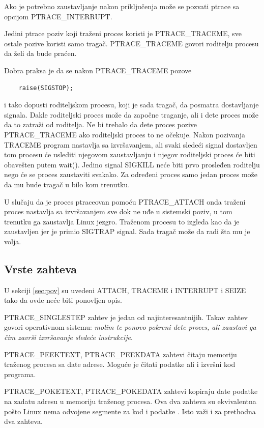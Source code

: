 \documentclass[a4paper]{article}
\begin{document}
Ako je potrebno zaustavljanje nakon priključenja može se pozvati ptrace sa opcijom PTRACE\_INTERRUPT.

Jedini ptrace poziv koji traženi proces koristi je PTRACE\_TRACEME, sve ostale pozive koristi samo tragač.
PTRACE\_TRACEME govori roditelju procesu da želi da bude praćen.

Dobra praksa je da se nakon PTRACE\_TRACEME pozove 
\begin{verbatim}
    raise(SIGSTOP);
\end{verbatim}
i tako dopusti roditeljskom procesu, koji je sada tragač, da posmatra dostavljanje signala.
Dakle roditeljski proces može da započne traganje, ali i dete proces može da to zatraži od roditelja.
Ne bi trebalo da dete proces pozive PTRACE\_TRACEME ako roditeljski proces to ne očekuje. 
Nakon pozivanja TRACEME program nastavlja sa izvršavanjem, ali svaki sledeći signal dostavljen tom procesu
će uslediti njegovom zaustavljanju i njegov roditeljski proces će biti obavešten putem wait(). 
Jedino signal SIGKILL neće biti prvo prosleđen roditelju nego će se proces zaustaviti svakako.
Za određeni proces samo jedan proces može da mu bude tragač u bilo kom trenutku.

U slučaju da je proces ptraceovan pomoću PTRACE\_ATTACH onda traženi proces nastavlja sa izvršavanjem sve dok ne
uđe u sistemski poziv, u tom trenutku ga zaustavlja Linux jezgro. Traženom procesu to izgleda kao da je zaustavljen
jer je primio SIGTRAP signal. Sada tragač može da radi šta mu je volja.

\subsection{Vrste zahteva}	
U sekciji \ref{sec:pov} su uvedeni 
ATTACH, TRACEME i INTERRUPT i SEIZE tako da ovde neće biti ponovljen opis.

PTRACE\_SINGLESTEP
    zahtev je jedan od najinteresantnijih. Takav zahtev govori operativnom sistemu: \emph{molim te ponovo pokreni
    dete proces, ali zaustavi ga čim završi izvršavanje sledeće instrukcije}.

PTRACE\_PEEKTEXT, PTRACE\_PEEKDATA
    zahtevi čitaju memoriju traženog procesa sa date adrese. Moguće je čitati podatke ali i izvršni kod programa.

PTRACE\_POKETEXT, PTRACE\_POKEDATA
    zahtevi kopiraju date podatke na zadatu adresu u memoriju traženog procesa.
    Ova dva zahteva su ekvivalentna pošto Linux nema odvojene segmente za kod i podatke \cite{man}. 
    Isto važi i za prethodna dva zahteva.
\end{document}
